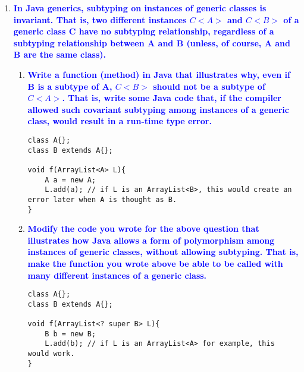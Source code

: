 \documentclass[10pt]{article}
\begin{document}
\begin{enumerate}
    
    \item \textbf{\textcolor{blue}{In Java generics, subtyping on instances of generic classes is invariant. That is, two different instances $C<A>$ and $C<B>$ of a generic class C have no subtyping relationship, regardless of a
    subtyping relationship between A and B (unless, of course, A and B are the same class).}}
    \begin{enumerate}
        \item \textbf{\textcolor{blue}{Write a function (method) in Java that illustrates why, even if B is a subtype of A, $C<B>$ should not be a subtype of $C<A>$. That is, write some Java code that, if the compiler allowed such covariant subtyping among instances of a generic class, would result in a run-time type error.}}
            \begin{verbatim}
class A{};
class B extends A{};

void f(ArrayList<A> L){
    A a = new A;
    L.add(a); // if L is an ArrayList<B>, this would create an error later when A is thought as B.
}
            \end{verbatim}
        \item \textbf{\textcolor{blue}{Modify the code you wrote for the above question that illustrates how Java allows a form of polymorphism among instances of generic classes, without allowing subtyping. That is, make the function you wrote above be able to be called with many different instances of a generic class.}}
            \begin{verbatim}
class A{};
class B extends A{};

void f(ArrayList<? super B> L){
    B b = new B;
    L.add(b); // if L is an ArrayList<A> for example, this would work.
}
            \end{verbatim}
    \end{enumerate}
    

\end{enumerate}
\end{document}
